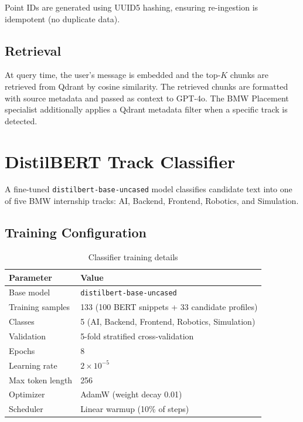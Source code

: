 \documentclass[12pt, a4paper]{article}
\begin{document}
Point IDs are generated using UUID5 hashing, ensuring re-ingestion is idempotent (no duplicate data).

\subsection{Retrieval}

At query time, the user's message is embedded and the top-$K$ chunks are retrieved from Qdrant by cosine similarity. The retrieved chunks are formatted with source metadata and passed as context to GPT-4o. The BMW Placement specialist additionally applies a Qdrant metadata filter when a specific track is detected.

\section{DistilBERT Track Classifier}

A fine-tuned \texttt{distilbert-base-uncased} model classifies candidate text into one of five BMW internship tracks: AI, Backend, Frontend, Robotics, and Simulation.

\subsection{Training Configuration}

\begin{table}[H]
\centering
\caption{Classifier training details}
\begin{tabular}{l l}
\toprule
\textbf{Parameter} & \textbf{Value} \\
\midrule
Base model & \texttt{distilbert-base-uncased} \\
Training samples & 133 (100 BERT snippets + 33 candidate profiles) \\
Classes & 5 (AI, Backend, Frontend, Robotics, Simulation) \\
Validation & 5-fold stratified cross-validation \\
Epochs & 8 \\
Learning rate & $2 \times 10^{-5}$ \\
Max token length & 256 \\
Optimizer & AdamW (weight decay 0.01) \\
Scheduler & Linear warmup (10\% of steps) \\
\bottomrule
\end{tabular}
\label{tab:bert_config}
\end{table}
\end{document}
